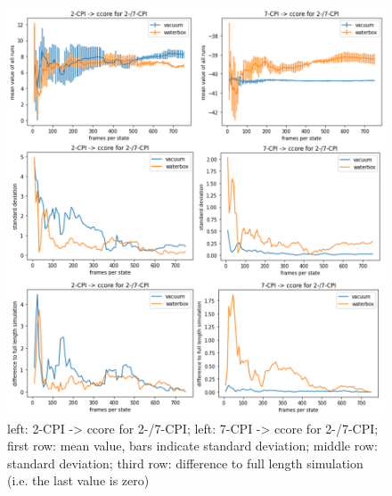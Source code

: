 \begin{figure}[!htb]
	
	\includegraphics[scale=0.9]{cpi_short}\caption{left: 2-CPI -> ccore for 2-/7-CPI; left: 7-CPI -> ccore for 2-/7-CPI; first row: mean value, bars indicate standard deviation; middle row: standard deviation; third row: difference to full length simulation (i.e. the last value is zero)}
	\label{fig:cpi_short}
\end{figure}
